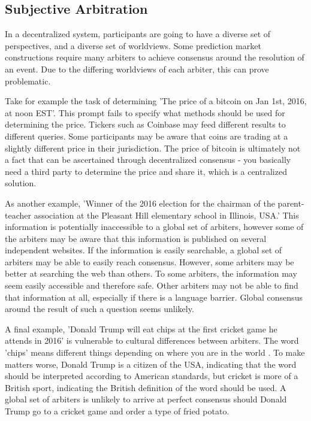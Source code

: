 \documentclass[onecolumn]{article}
\begin{document}
\begin{appendices}

\section{Subjective Arbitration}
In a decentralized system, participants are going to have a diverse set of perspectives, and a diverse set of worldviews.
Some prediction market constructions require many arbiters to achieve consensus around the resolution of an event.
Due to the differing worldviews of each arbiter, this can prove problematic.

Take for example the task of determining 'The price of a bitcoin on Jan 1st, 2016, at noon EST'.
This prompt fails to specify what methods should be used for determining the price.
Tickers such as Coinbase may feed different results to different queries.
Some participants may be aware that coins are trading at a slightly different price in their jurisdiction.
The price of bitcoin is ultimately not a fact that can be ascertained through decentralized consensus - you basically need a third party to determine the price and share it, which is a centralized solution.

As another example, 'Winner of the 2016 election for the chairman of the parent-teacher association at the Pleasant Hill elementary school in Illinois, USA.'
This information is potentially inaccessible to a global set of arbiters, however some of the arbiters may be aware that this information is published on several independent websites.
If the information is easily searchable, a global set of arbiters may be able to easily reach consensus.
However, some arbiters may be better at searching the web than others.
To some arbiters, the information may seem easily accessible and therefore safe.
Other arbiters may not be able to find that information at all, especially if there is a language barrier.
Global consensus around the result of such a question seems unlikely.

A final example, 'Donald Trump will eat chips at the first cricket game he attends in 2016' is vulnerable to cultural differences between arbiters.
The word 'chips' means different things depending on where you are in the world \cite{chips}.
To make matters worse, Donald Trump is a citizen of the USA, indicating that the word should be interpreted according to American standards,
but cricket is more of a British sport, indicating the British definition of the word should be used.
A global set of arbiters is unlikely to arrive at perfect consensus should Donald Trump go to a cricket game and order a type of fried potato.


\end{appendices}
\end{document}
